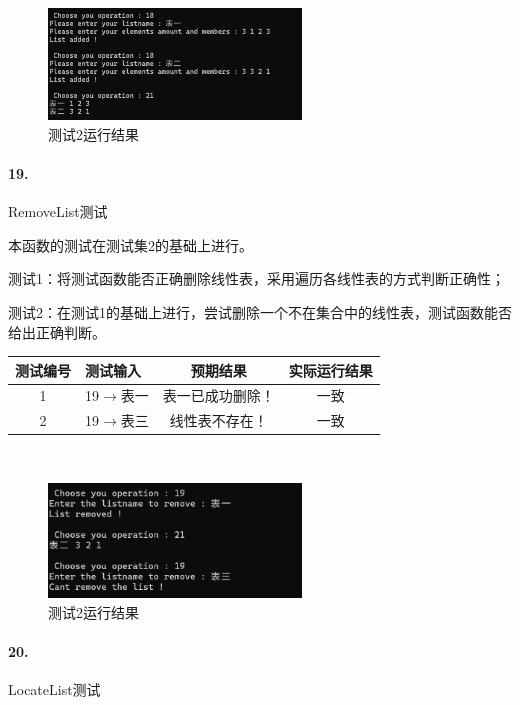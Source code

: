 \documentclass[supercite]{Experimental_Report}
\theoremstyle{definition}
\begin{document}
~\

 \begin{figure}[H]
 	\centering
 	\includegraphics[width=0.6\textwidth]{images/线性表测试18.png}
 	\caption{测试2运行结果}
 	\label{txlab}
 \end{figure}

\paragraph{19.}RemoveList测试

本函数的测试在测试集2的基础上进行。

测试1：将测试函数能否正确删除线性表，采用遍历各线性表的方式判断正确性；

测试2：在测试1的基础上进行，尝试删除一个不在集合中的线性表，测试函数能否给出正确判断。

\vspace{0.5em}

\begin{tabular}{|c|p{2.7cm}|c|c|}
	\hline
	测试编号 & 测试输入 & 预期结果 & 实际运行结果 \\
	\hline
	1 & 19$\rightarrow$表一 & 表一已成功删除！ & 一致 \\
	\hline
	2 & 19$\rightarrow$表三 & 线性表不存在！ & 一致 \\
	\hline
\end{tabular}

~\

 \begin{figure}[H]
 	\centering
 	\includegraphics[width=0.6\textwidth]{images/线性表测试19.png}
 	\caption{测试2运行结果}
 	\label{txlab}
 \end{figure}

\paragraph{20.}LocateList测试
	
\end{document}
